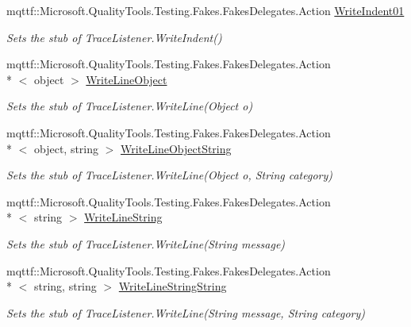 \begin{DoxyCompactItemize}
mqttf\-::\-Microsoft.\-Quality\-Tools.\-Testing.\-Fakes.\-Fakes\-Delegates.\-Action \hyperlink{class_system_1_1_diagnostics_1_1_fakes_1_1_stub_trace_listener_aa9d5761767a2ecc60a3db129716130dd}{Write\-Indent01}
\begin{DoxyCompactList}\small\item\em Sets the stub of Trace\-Listener.\-Write\-Indent()\end{DoxyCompactList}\item 
mqttf\-::\-Microsoft.\-Quality\-Tools.\-Testing.\-Fakes.\-Fakes\-Delegates.\-Action\\*
$<$ object $>$ \hyperlink{class_system_1_1_diagnostics_1_1_fakes_1_1_stub_trace_listener_a69bf38a6fcd21de1b4cc9af632e6d5ff}{Write\-Line\-Object}
\begin{DoxyCompactList}\small\item\em Sets the stub of Trace\-Listener.\-Write\-Line(\-Object o)\end{DoxyCompactList}\item 
mqttf\-::\-Microsoft.\-Quality\-Tools.\-Testing.\-Fakes.\-Fakes\-Delegates.\-Action\\*
$<$ object, string $>$ \hyperlink{class_system_1_1_diagnostics_1_1_fakes_1_1_stub_trace_listener_a155261d1acef8b8b5f24e3be80c1d46a}{Write\-Line\-Object\-String}
\begin{DoxyCompactList}\small\item\em Sets the stub of Trace\-Listener.\-Write\-Line(\-Object o, String category)\end{DoxyCompactList}\item 
mqttf\-::\-Microsoft.\-Quality\-Tools.\-Testing.\-Fakes.\-Fakes\-Delegates.\-Action\\*
$<$ string $>$ \hyperlink{class_system_1_1_diagnostics_1_1_fakes_1_1_stub_trace_listener_a27660ec750623912cdb91edd318fdd7c}{Write\-Line\-String}
\begin{DoxyCompactList}\small\item\em Sets the stub of Trace\-Listener.\-Write\-Line(\-String message)\end{DoxyCompactList}\item 
mqttf\-::\-Microsoft.\-Quality\-Tools.\-Testing.\-Fakes.\-Fakes\-Delegates.\-Action\\*
$<$ string, string $>$ \hyperlink{class_system_1_1_diagnostics_1_1_fakes_1_1_stub_trace_listener_a7b21a2a93b960cce85a1068d6b0314d2}{Write\-Line\-String\-String}
\begin{DoxyCompactList}\small\item\em Sets the stub of Trace\-Listener.\-Write\-Line(\-String message, String category)\end{DoxyCompactList}\item 

\end{DoxyCompactItemize}
